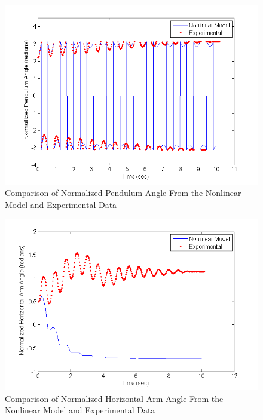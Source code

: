 \documentclass{article}
\theoremstyle{plain}
\theoremstyle{definition}
\theoremstyle{remark}
\begin{document}
\begin{figure}[hbt]
\begin{center}
\includegraphics[width = 13cm]{alpha1.png}
\end{center}
\caption{Comparison of Normalized Pendulum Angle From the Nonlinear Model and Experimental Data}
\label{q3_1}
\end{figure}

\begin{figure}[hbt]
\begin{center}
\includegraphics[width = 13cm]{theta1.png}
\end{center}
\caption{Comparison of Normalized Horizontal Arm Angle From the Nonlinear Model and Experimental Data}
\label{q3_2}
\end{figure}
\end{document}
